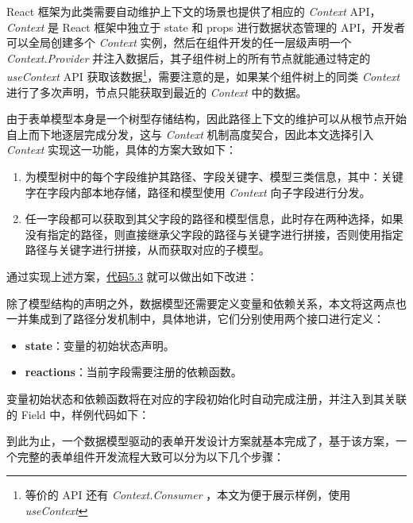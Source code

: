 \documentclass[winfonts,master,twoside]{njuthesis}
\begin{document}
React 框架为此类需要自动维护上下文的场景也提供了相应的 \textit{Context} API，\textit{Context} 是 React 框架中独立于 state 和 props 进行数据状态管理的 API，开发者可以全局创建多个 \textit{Context} 实例，然后在组件开发的任一层级声明一个 \textit{Context.Provider} 并注入数据后，其子组件树上的所有节点就能通过特定的 \textit{useContext} API 获取该数据\footnote{等价的 API 还有 \textit{Context.Consumer} ，本文为便于展示样例，使用 \textit{useContext} }，需要注意的是，如果某个组件树上的同类 \textit{Context} 进行了多次声明，节点只能获取到最近的 \textit{Context} 中的数据。

由于表单模型本身是一个树型存储结构，因此路径上下文的维护可以从根节点开始自上而下地逐层完成分发，这与 \textit{Context} 机制高度契合，因此本文选择引入 \textit{Context} 实现这一功能，具体的方案大致如下：

\begin{enumerate}
    \item 为模型树中的每个字段维护其路径、字段关键字、模型三类信息，其中：关键字在字段内部本地存储，路径和模型使用 \textit{Context} 向子字段进行分发。
    \item 任一字段都可以获取到其父字段的路径和模型信息，此时存在两种选择，如果没有指定的路径，则直接继承父字段的路径与关键字进行拼接，否则使用指定路径与关键字进行拼接，从而获取对应的子模型。
\end{enumerate}

通过实现上述方案，\hyperref[entire-path-model-distribute]{代码5.3} 就可以做出如下改进：



除了模型结构的声明之外，数据模型还需要定义变量和依赖关系，本文将这两点也一并集成到了路径分发机制中，具体地讲，它们分别使用两个接口进行定义：

\begin{itemize}
    \item \textbf{state}：变量的初始状态声明。
    \item \textbf{reactions}：当前字段需要注册的依赖函数。
\end{itemize}

变量初始状态和依赖函数将在对应的字段初始化时自动完成注册，并注入到其关联的 Field 中，样例代码如下：



到此为止，一个数据模型驱动的表单开发设计方案就基本完成了，基于该方案，一个完整的表单组件开发流程大致可以分为以下几个步骤：
\end{document}
